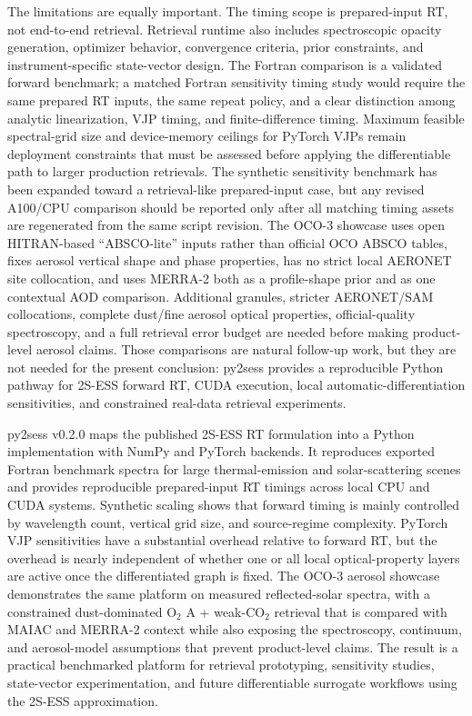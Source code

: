 \documentclass[gmd, manuscript]{copernicus}
\begin{document}
The limitations are equally important.  The timing scope is prepared-input RT, not
end-to-end retrieval.  Retrieval runtime also includes spectroscopic opacity
generation, optimizer behavior, convergence criteria, prior constraints, and
instrument-specific state-vector design.  The Fortran comparison is a validated forward
benchmark; a matched Fortran sensitivity timing study would require the same prepared
RT inputs, the same repeat policy, and a clear distinction among analytic
linearization, VJP timing, and finite-difference timing.  Maximum feasible spectral-grid
size and device-memory ceilings for PyTorch VJPs remain deployment constraints that
must be assessed before applying the differentiable path to larger production
retrievals.  The synthetic sensitivity benchmark has been expanded toward a
retrieval-like prepared-input case, but any revised A100/CPU comparison should be
reported only after all matching timing assets are regenerated from the same script
revision.  The OCO-3 showcase uses
open HITRAN-based
``ABSCO-lite'' inputs rather than official OCO ABSCO tables, fixes aerosol vertical
shape and phase properties, has no strict local AERONET site collocation, and uses
MERRA-2 both as a profile-shape prior and as one contextual AOD comparison.  Additional
granules, stricter AERONET/SAM collocations, complete dust/fine aerosol optical
properties, official-quality spectroscopy, and a full retrieval error budget are needed
before making product-level aerosol claims.  Those comparisons are natural follow-up
work, but they are not needed for the present conclusion: py2sess provides a
reproducible Python pathway for 2S-ESS forward RT, CUDA execution, local
automatic-differentiation sensitivities, and constrained real-data retrieval
experiments.

\conclusions

py2sess v0.2.0 maps the published 2S-ESS RT formulation into a Python implementation
with NumPy and PyTorch backends.  It reproduces exported Fortran benchmark spectra for
large thermal-emission and solar-scattering scenes and provides reproducible
prepared-input RT timings across local CPU and CUDA systems.  Synthetic scaling shows
that forward timing is mainly controlled by wavelength count, vertical grid size, and
source-regime complexity.  PyTorch VJP sensitivities have a substantial overhead
relative to forward RT, but the overhead is nearly independent of whether one or all
local optical-property layers are active once the differentiated graph is fixed.  The
OCO-3 aerosol showcase demonstrates the same platform on measured reflected-solar
spectra, with a constrained dust-dominated O$_2$ A + weak-CO$_2$ retrieval that is
compared with MAIAC and MERRA-2 context while also exposing the spectroscopy,
continuum, and aerosol-model assumptions that prevent product-level claims.  The
result is a practical benchmarked platform for retrieval prototyping, sensitivity
studies, state-vector experimentation, and future differentiable surrogate workflows
using the 2S-ESS approximation.
\end{document}
